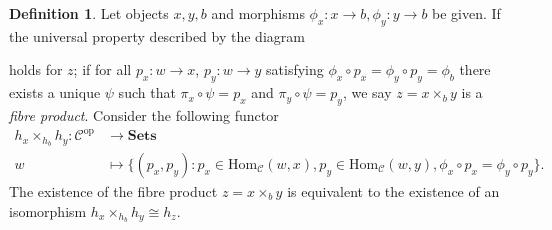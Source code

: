 \documentclass[12pt]{report}
\theoremstyle{plain}
\theoremstyle{remark}
\theoremstyle{definition}
\newtheorem{definition}[theorem]{Definition}
\newcommand{\Hom}[3]{\mathrm{Hom}_{#3}(#1,#2)}
\begin{document}
\begin{definition}
    Let objects $x,y,b$ and morphisms $\phi_x:x\rightarrow b,\phi_y:y\rightarrow b$ be given. If the universal property described by the diagram
    \begin{figure}[H]
    \centering
    \end{figure}
    \noindent holds for $z$; if for all $p_x:w\to x$, $p_y:w\to y$ satisfying $\phi_x \circ p_x = \phi_y\circ p_y=\phi_b$ there exists a unique $\psi$ such that $\pi_x\circ \psi = p_x$ and $\pi_y\circ \psi = p_y$, we say $z=x\times_b y$ is a \emph{fibre product}. Consider the following functor
    \begin{align*}
        h_x \times_{h_b} h_y : \mathcal{C}^\mathrm{op} &\rightarrow \mathbf{Sets} \\
        w &\mapsto \{ (p_x,p_y) : p_x\in \Hom{w}{x}{\mathcal{C}},p_y\in\Hom{w}{y}{\mathcal{C}},\phi_x\circ p_x = \phi_y\circ p_y \}.
    \end{align*}
    The existence of the fibre product $z=x\times_b y$ is equivalent to the existence of an isomorphism $h_x\times_{h_b} h_y \cong h_z$.
\end{definition}
\end{document}
